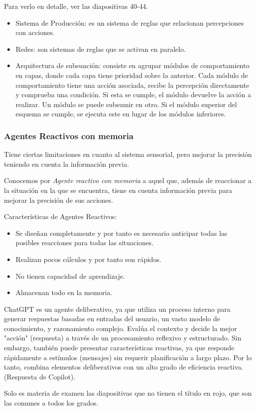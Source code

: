 Para verlo en detalle, ver las diapositivas 40-44.

\begin{itemize}
    \item Sistema de Producción: es un sistema de reglas que relacionan percepciones con acciones.
    \item Redes: son sistemas de reglas que se activan en paralelo.
    \item Arquitectura de subsunción: consiste en agrupar módulos de comportamiento en capas, donde cada capa tiene prioridad sobre la anterior. Cada módulo de comportamiento tiene una
    acción asociada, recibe la percepción
    directamente y comprueba una condición. Si esta
    se cumple, el módulo devuelve la acción a
    realizar.
    Un módulo se puede subsumir en otro. Si el
    módulo superior del esquema se cumple, se
    ejecuta este en lugar de los módulos inferiores.
\end{itemize}

\subsubsection{Agentes Reactivos con memoria}

Tiene ciertas limitaciones en cuanto al sistema sensorial, pero mejorar la precisión teniendo en cuenta la información previa.

Conocemos por \textit{Agente reactivo con memoria} a aquel que, además de reaccionar a la situación en la que se encuentra, tiene en cuenta información previa para mejorar la precisión de sus acciones.

Características de Agentes Reactivos:

\begin{itemize}
    \item Se diseñan completamente y por tanto es necesario anticipar todas
    las posibles reacciones para todas las situaciones.
    \item Realizan pocos cálculos y por tanto son rápidos.
    \item No tienen capacidad de aprendizaje.
    \item Almacenan todo en la memoria.
\end{itemize}

\begin{tcolorbox}[colback=yellow!10!white, colframe=yellow!90!black, title=¿Qué tipo de agente es ChatGPT?]
ChatGPT es un agente deliberativo, ya que utiliza un
proceso interno para generar respuestas basadas en
entradas del usuario, un vasto modelo de
conocimiento, y razonamiento complejo. Evalúa el
contexto y decide la mejor "acción" (respuesta) a
través de un procesamiento reflexivo y estructurado.
Sin embargo, también puede presentar características
reactivas, ya que responde rápidamente a estímulos
(mensajes) sin requerir planificación a largo plazo. Por
lo tanto, combina elementos deliberativos con un alto
grado de eficiencia reactiva. (Respuesta de Copilot).
\end{tcolorbox}

\begin{tcolorbox}[colback=red!10!white, colframe=red!90!black, title=Advertencia]
Solo es materia de examen las diapositivas que no tienen el título en rojo, que son las comunes a todos los grados.
\end{tcolorbox}